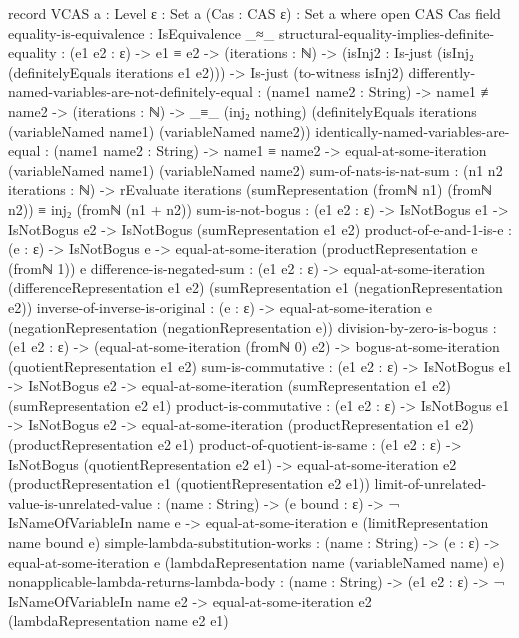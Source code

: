 \documentclass{report}
\begin{document}
\begin{code}
record VCAS {a : Level} {ε : Set a} (Cas : CAS ε) : Set a where
  open CAS Cas
  field
    equality-is-equivalence : IsEquivalence _≈_
    structural-equality-implies-definite-equality :
      (e1 e2 : ε) ->
      e1 ≡ e2 ->
      (iterations : ℕ) ->
      (isInj2 : Is-just (isInj₂ (definitelyEquals iterations e1 e2))) ->
      Is-just (to-witness isInj2)
    differently-named-variables-are-not-definitely-equal :
      (name1 name2 : String) ->
      name1 ≢ name2 ->
      (iterations : ℕ) ->
      _≡_ (inj₂ nothing)
          (definitelyEquals iterations
                            (variableNamed name1)
                            (variableNamed name2))
    identically-named-variables-are-equal :
      (name1 name2 : String) ->
      name1 ≡ name2 ->
      equal-at-some-iteration (variableNamed name1) (variableNamed name2)
    sum-of-nats-is-nat-sum :
      (n1 n2 iterations : ℕ) ->
      rEvaluate iterations (sumRepresentation (fromℕ n1) (fromℕ n2)) ≡
        inj₂ (fromℕ (n1 + n2))
    sum-is-not-bogus :
      (e1 e2 : ε) ->
      IsNotBogus e1 ->
      IsNotBogus e2 ->
      IsNotBogus (sumRepresentation e1 e2)
    product-of-e-and-1-is-e :
      (e : ε) ->
      IsNotBogus e ->
      equal-at-some-iteration (productRepresentation e (fromℕ 1)) e
    difference-is-negated-sum :
      (e1 e2 : ε) ->
      equal-at-some-iteration (differenceRepresentation e1 e2)
                              (sumRepresentation e1 (negationRepresentation e2))
    inverse-of-inverse-is-original :
      (e : ε) ->
      equal-at-some-iteration e (negationRepresentation (negationRepresentation e))
    division-by-zero-is-bogus :
      (e1 e2 : ε) ->
      (equal-at-some-iteration (fromℕ 0) e2) ->
      bogus-at-some-iteration (quotientRepresentation e1 e2)
    sum-is-commutative :
      (e1 e2 : ε) ->
      IsNotBogus e1 ->
      IsNotBogus e2 ->
      equal-at-some-iteration (sumRepresentation e1 e2)
                              (sumRepresentation e2 e1)
    product-is-commutative :
      (e1 e2 : ε) ->
      IsNotBogus e1 ->
      IsNotBogus e2 ->
      equal-at-some-iteration (productRepresentation e1 e2)
                              (productRepresentation e2 e1)
    product-of-quotient-is-same :
      (e1 e2 : ε) ->
      IsNotBogus (quotientRepresentation e2 e1) ->
      equal-at-some-iteration e2 (productRepresentation e1 (quotientRepresentation e2 e1))
    limit-of-unrelated-value-is-unrelated-value :
      (name : String) ->
      (e bound : ε) ->
      ¬ IsNameOfVariableIn name e ->
      equal-at-some-iteration e (limitRepresentation name bound e)
    simple-lambda-substitution-works :
      (name : String) ->
      (e : ε) ->
      equal-at-some-iteration e (lambdaRepresentation name (variableNamed name) e)
    nonapplicable-lambda-returns-lambda-body :
      (name : String) ->
      (e1 e2 : ε) ->
      ¬ IsNameOfVariableIn name e2 ->
      equal-at-some-iteration e2 (lambdaRepresentation name e2 e1)
\end{code}
\end{document}
